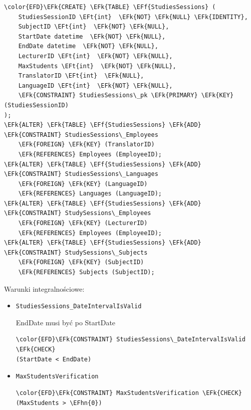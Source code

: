 \documentclass[11pt]{article}
\newcommand{\EFk}[1]{\textcolor{EFk}{\textbf{#1}}} %
\newcommand{\EFf}[1]{\textcolor{EFf}{#1}} %
\newcommand{\EFt}[1]{\textcolor{EFt}{\textbf{#1}}} %
\newcommand{\EFhn}[1]{\textcolor{EFhn}{#1}} %
\begin{document}
\begin{Code}
\begin{Verbatim}
\color{EFD}\EFk{CREATE} \EFk{TABLE} \EFf{StudiesSessions} (
    StudiesSessionID \EFt{int}  \EFk{NOT} \EFk{NULL} \EFk{IDENTITY},
    SubjectID \EFt{int}  \EFk{NOT} \EFk{NULL},
    StartDate datetime  \EFk{NOT} \EFk{NULL},
    EndDate datetime  \EFk{NOT} \EFk{NULL},
    LecturerID \EFt{int}  \EFk{NOT} \EFk{NULL},
    MaxStudents \EFt{int}  \EFk{NOT} \EFk{NULL},
    TranslatorID \EFt{int}  \EFk{NULL},
    LanguageID \EFt{int}  \EFk{NOT} \EFk{NULL},
    \EFk{CONSTRAINT} StudiesSessions\_pk \EFk{PRIMARY} \EFk{KEY}  (StudiesSessionID)
);
\EFk{ALTER} \EFk{TABLE} \EFf{StudiesSessions} \EFk{ADD} \EFk{CONSTRAINT} StudiesSessions\_Employees
    \EFk{FOREIGN} \EFk{KEY} (TranslatorID)
    \EFk{REFERENCES} Employees (EmployeeID);
\EFk{ALTER} \EFk{TABLE} \EFf{StudiesSessions} \EFk{ADD} \EFk{CONSTRAINT} StudiesSessions\_Languages
    \EFk{FOREIGN} \EFk{KEY} (LanguageID)
    \EFk{REFERENCES} Languages (LanguageID);
\EFk{ALTER} \EFk{TABLE} \EFf{StudiesSessions} \EFk{ADD} \EFk{CONSTRAINT} StudySessions\_Employees
    \EFk{FOREIGN} \EFk{KEY} (LecturerID)
    \EFk{REFERENCES} Employees (EmployeeID);
\EFk{ALTER} \EFk{TABLE} \EFf{StudiesSessions} \EFk{ADD} \EFk{CONSTRAINT} StudySessions\_Subjects
    \EFk{FOREIGN} \EFk{KEY} (SubjectID)
    \EFk{REFERENCES} Subjects (SubjectID);
\end{Verbatim}
\end{Code}
Warunki integralnościowe:


\begin{itemize}
\item \texttt{StudiesSessions\_DateIntervalIsValid}

EndDate musi być po StartDate
\begin{Code}
\begin{Verbatim}
\color{EFD}\EFk{CONSTRAINT} StudiesSessions\_DateIntervalIsValid \EFk{CHECK}
(StartDate < EndDate)
\end{Verbatim}
\end{Code}
\item \texttt{MaxStudentsVerification}
\begin{Code}
\begin{Verbatim}
\color{EFD}\EFk{CONSTRAINT} MaxStudentsVerification \EFk{CHECK}
(MaxStudents > \EFhn{0})
\end{Verbatim}
\end{Code}
\end{itemize}
\end{document}
